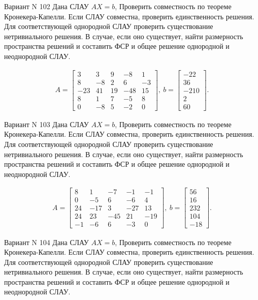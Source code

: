 \documentclass[11pt]{report}
\begin{document}
Вариант N 102
Дана СЛАУ $AX = b$,
Проверить совместность по теореме Кронекера-Капелли. Если СЛАУ совместна, проверить единственность решения.
Для соответствующей однородной СЛАУ проверить существование нетривиального решения. В случае, если оно существует,
найти размерность пространства решений и составить ФСР и общее решение однородной  и неоднородной СЛАУ.


\begin{align*}
 A = \left[\begin{matrix}3 & 3 & 9 & -8 & 1\\8 & -8 & 2 & 6 & -3\\-23 & 41 & 19 & -48 & 15\\8 & 1 & 7 & -5 & 8\\0 & -8 & 5 & -2 & 0\end{matrix}\right],
\ b = \left[\begin{matrix}-22\\36\\-210\\2\\60\end{matrix}\right]. 
 \end{align*}

Вариант N 103
Дана СЛАУ $AX = b$,
Проверить совместность по теореме Кронекера-Капелли. Если СЛАУ совместна, проверить единственность решения.
Для соответствующей однородной СЛАУ проверить существование нетривиального решения. В случае, если оно существует,
найти размерность пространства решений и составить ФСР и общее решение однородной  и неоднородной СЛАУ.


\begin{align*}
 A = \left[\begin{matrix}8 & 1 & -7 & -1 & -1\\0 & -5 & 6 & -6 & 4\\24 & -17 & 3 & -27 & 13\\24 & 23 & -45 & 21 & -19\\-1 & -6 & 6 & -3 & 0\end{matrix}\right],
\ b = \left[\begin{matrix}56\\16\\232\\104\\-18\end{matrix}\right]. 
 \end{align*}

Вариант N 104
Дана СЛАУ $AX = b$,
Проверить совместность по теореме Кронекера-Капелли. Если СЛАУ совместна, проверить единственность решения.
Для соответствующей однородной СЛАУ проверить существование нетривиального решения. В случае, если оно существует,
найти размерность пространства решений и составить ФСР и общее решение однородной  и неоднородной СЛАУ.
\end{document}
